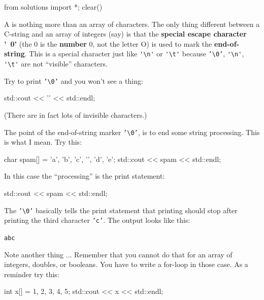 \begin{python0}
from solutions import *; clear()
\end{python0}

A  is nothing more than an array of characters. The only thing different between a C-string and an array of integers (say) is that the \textbf{special escape character '\ 0'} (the 0 is the \textbf{number} 0, not the letter O) is used to mark the \textbf{end-of-string}. This is a special character just like \verb!'\n'! or \verb!'\t'! because \texttt{'\textbackslash 0'}, \verb!'\n'!, \verb!'\t'! are not ``visible'' characters.

Try to print \texttt{'\textbackslash 0'} and you won't see a thing:

\begin{consolethree}[escapeinside=||]
std::cout << '\0' << std::endl;
\end{consolethree}

(There are in fact lots of invisible characters.)

The point of the end-of-string marker \texttt{'\textbackslash 0'}, is to end some string processing. This is what I mean. Try this:

\begin{consolethree}[escapeinside=||]
char spam[] = {'a', 'b', 'c', '\0', 'd', 'e'};
std::cout << spam << std::endl;
\end{consolethree}

In this case the ``processing'' is the print statement:

\begin{consolethree}[escapeinside=||]
std::cout << spam << std::endl;
\end{consolethree}

The \texttt{'\textbackslash 0'} basically tells the print statement that printing should stop after printing the third character \texttt{'c'}. The output looks like this:

\begin{center}
\texttt{abc}
\end{center}

Note another thing ...  Remember that you cannot do that for an array of integers, doubles, or booleans. You have to write a for-loop in those case. As a reminder try this:

\begin{consolethree}[escapeinside=||]
int x[] = {1, 2, 3, 4, 5};
std::cout << x << std::endl;
\end{consolethree}

